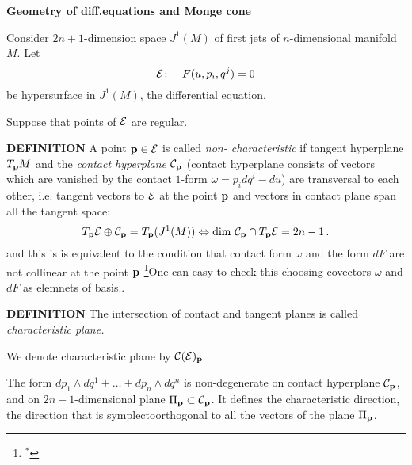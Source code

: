 

\baselineskip=14pt
\def\vare {\varepsilon}
\def\t {\tilde}
\def\a {\alpha}
\def\K {{\bf K}}
\def\N {{\bf N}}
\def\C {{\cal C}}
\def\L {{\cal L}}
\def\E {{\cal E}}
\def\s {{\sigma}}
\def\S {{\Sigma}}
\def\p{\partial}
\def\vare{{\varepsilon}}
\def\Q {{\bf Q}}
\def\D {{\cal D}}
\def\G {{\Gamma}}
\def\Z {{\bf Z}}
\def\R  {{\bf R}}
\def\l {\lambda}
\def\ll {{\bf l}}
\def\degree {{\bf {\rm degree}\,\,}}
\def \finish {${\,\,\vrule height1mm depth2mm width 8pt}$}
\def \m {\medskip}
\def\p {\partial}
\def\r {{\bf r}}
\def\pt {{\bf p}}
\def\v {{\bf v}}
\def\n {{\bf n}}
\def\t {{\bf t}}
\def\b {{\bf b}}
\def\c {{\bf c }}
\def\e{{\bf e}}
\def\ac {{\bf a}}
\def \X   {{\bf X}}
\def \Y   {{\bf Y}}
\def \x   {{\bf x}}
\def \y   {{\bf y}}
\def\w {{\omega}}
\def \Tr  {{\rm Tr\,}}
\def\dim {{\rm dim\,\,}}
\def\t {{\tilde}} 

   \centerline{\bf Geometry of diff.equations and Monge cone}
\m

Consider $2n+1$-dimension space $J^1(M)$  of first jets of
$n$-dimensional manifold $M$.
Let  
    $$
\E\colon\quad F(u,p_i,q^j)=0
    $$
be hypersurface in $J^1(M)$, the differential equation.

Suppose that points of $\E$ are regular.

\m

{\bf DEFINITION}
   A point $\pt\in\E$ is called {\it non- characteristic}
if tangent hyperplane $T_\pt M$ and
 the {\it contact hyperplane} $\C_\pt$  
(contact hyperplane consists of vectors
which are vanished by 
the contact $1$-form $\w=p_idq^i-du$)
are transversal to each other, i.e. tangent vectors
to $\E$ at the point $\pt$ and vectors in contact plane
span all the tangent space:
            $$
     T_\pt \E\oplus \C_\pt=T_\pt (J^1(M))
            \Leftrightarrow
\dim \C_\pt\cap T_\pt\E=2n-1\,.
        $$
and  this is  is equivalent to the condition
that contact form $\w$ and the form $dF$ are not collinear
at the point $\pt$ \footnote{$^*$}{One can easy to check this choosing
covectors $\w$ and $dF$ as elemnets of basis.}.


\m

{\bf DEFINITION}
The intersection of contact and  tangent planes is
called {\it characteristic plane.} 

\m



We denote  characteristic plane by $\C(\E)_\pt$

     
The form $dp_1\wedge dq^1+\dots+dp_n\wedge dq^n$  
is non-degenerate on contact hyperplane $\C_\pt$, and
on $2n-1$-dimensional plane $\Pi_\pt\subset \C_\pt$.
It  defines the  characteristic direction, the direction that
is symplectoorthogonal  to all the vectors of the plane $\Pi_\pt$.

